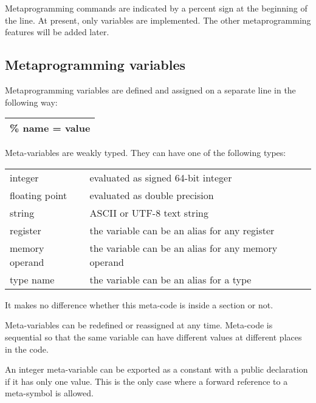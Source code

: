 \documentclass[forwardcom.tex]{subfiles}
\begin{document}
Metaprogramming commands are indicated by a percent sign at the beginning of the line.
At present, only variables are implemented. The other metaprogramming features will be added later.
\vspace{2mm}


\subsection{Metaprogramming variables} \label{MetaprogrammingVariables}

Metaprogramming variables are defined and assigned on a separate line in the following way:
\vspace{2mm}

\begin{tabular}{|p{154mm}|}
\hline
\hspace{4mm} \% name = value\\
\hline
\end{tabular}
\vspace{4mm}

Meta-variables are weakly typed. They can have one of the following types:

\begin{tabular}{|p{30mm}p{120mm}|}
\hline
integer & evaluated as signed 64-bit integer \\
floating point & evaluated as double precision\\
string & ASCII or UTF-8 text string\\
register & the variable can be an alias for any register\\
memory operand & the variable can be an alias for any memory operand\\
type name & the variable can be an alias for a type\\
\hline
\end{tabular}
\vspace{2mm}

It makes no difference whether this meta-code is inside a section or not.
\vspace{2mm}

Meta-variables can be redefined or reassigned at any time. Meta-code is sequential so that the same variable can have different values at different places in the code.
\vspace{2mm}

An integer meta-variable can be exported as a constant with a public declaration if it has only one value. This is the only case where a forward reference to a meta-symbol is allowed.
\vspace{2mm}
\end{document}
